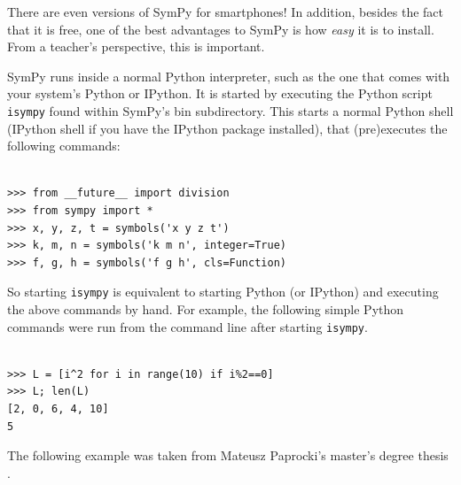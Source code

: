 \documentclass[12pt]{article}
\begin{document}
There are even versions of SymPy for smartphones!
In addition, besides the fact that it is free, one of the best advantages 
to SymPy is how {\it easy} it is to install.
From a teacher's perspective, this is important. 

SymPy runs inside a normal Python interpreter, such as the one that
comes with your system's Python or IPython.
It is started by executing the Python script {\tt isympy}
found within SymPy's bin subdirectory.
This starts a normal Python shell (IPython shell if you have the
IPython package installed),  that (pre)executes the following commands:

\begin{Verbatim}[fontsize=\scriptsize,fontfamily=courier,fontshape=tt,frame=single,label=Python]

>>> from __future__ import division
>>> from sympy import *
>>> x, y, z, t = symbols('x y z t')
>>> k, m, n = symbols('k m n', integer=True)
>>> f, g, h = symbols('f g h', cls=Function)

\end{Verbatim}
So starting {\tt isympy} is equivalent to starting Python (or IPython)
and executing the above commands by hand. 
For example, the following simple Python commands were run 
from the command line after starting {\tt isympy}.

\begin{Verbatim}[fontsize=\scriptsize,fontfamily=courier,fontshape=tt,frame=single,label=SymPy]

>>> L = [i^2 for i in range(10) if i%2==0]
>>> L; len(L)
[2, 0, 6, 4, 10]
5

\end{Verbatim}

The following example was taken from Mateusz Paprocki's master's
degree thesis \cite{P}.
\end{document}
